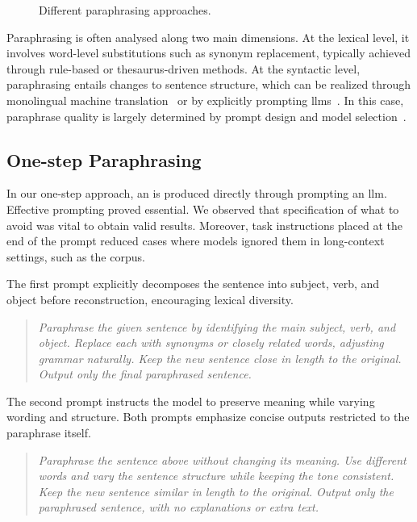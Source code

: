 \begin{figure}[h]
    \centering
    
    \caption{Different paraphrasing approaches.}
    \label{fig:paraphrasing_approaches}
\end{figure}


Paraphrasing is often analysed along two main dimensions. 
At the lexical level, it involves word-level substitutions such as synonym replacement, typically achieved through rule-based or thesaurus-driven methods. 
At the syntactic level, paraphrasing entails changes to sentence structure, which can be realized through monolingual machine translation~\citep{zhou_paraphrase_2021} or by explicitly prompting \acp{llm}~\citep{kurt_pehlivanoglu_comparative_2024}.
In this case, paraphrase quality is largely determined by prompt design and model selection~\citep{Wu_ODD_challenges_2025}.


\subsection{One-step Paraphrasing}

In our one-step approach, an \imp{} is produced directly through prompting an \ac{llm}. 
Effective prompting proved essential.
We observed that specification of what to avoid was vital to obtain valid results. 
Moreover, task instructions placed at the end of the prompt reduced cases where models ignored them in long-context settings, such as the \dataGutenberg{} corpus.

The first prompt explicitly decomposes the sentence into subject, verb, and object before reconstruction, encouraging lexical diversity. 
\begin{quote}
    \textit{Paraphrase the given sentence by identifying the main subject, verb, and object. Replace each with synonyms or closely related words, adjusting grammar naturally. Keep the new sentence close in length to the original. Output only the final paraphrased sentence.}
\end{quote}

The second prompt instructs the model to preserve meaning while varying wording and structure. 
Both prompts emphasize concise outputs restricted to the paraphrase itself.
\begin{quote}
    \textit{Paraphrase the sentence above without changing its meaning. Use different words and vary the sentence structure while keeping the tone consistent. Keep the new sentence similar in length to the original. Output only the paraphrased sentence, with no explanations or extra text.}
\end{quote}


